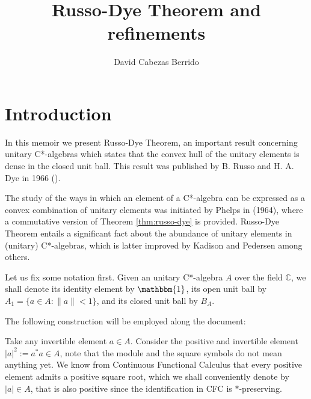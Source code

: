 \documentclass[12pt,english]{article}
\title{Russo-Dye Theorem and refinements}
\author{David Cabezas Berrido}
\date{}
\theoremstyle{definition}
\theoremstyle{remark}
\begin{document}
\maketitle

\section*{Introduction}

In this memoir we present Russo-Dye Theorem, an important result concerning unitary C*-algebras which states that the convex hull of the unitary elements is dense in the closed unit ball. This result was published by B. Russo and H. A. Dye in 1966 (\cite{russo-dye}).

The study of the ways in which an element of a C*-algebra can be expressed as a convex combination of unitary elements was initiated by Phelps in \cite{phelps} (1964), where a commutative version of Theorem \ref{thm:russo-dye} is provided. Russo-Dye Theorem entails a significant fact about the abundance of unitary elements in (unitary) C*-algebras, which is latter improved by Kadison and Pedersen among others.

Let us fix some notation first. Given an unitary C*-algebra $A$ over the field $\mathbb{C}$, we shall denote its identity element by $\mathbbm{1}$, its open unit ball by $A_1=\{a\in A: \|a\|<1\}$, and its closed unit ball by $B_A$.

The following construction will be employed along the document:

Take any invertible element $a\in A$. Consider the positive and invertible element $|a|^2:=a^*a\in A$, note that the module and the square symbols do not mean anything yet. We know from Continuous Functional Calculus that every positive element admits a positive square root, which we shall conveniently denote by $|a|\in A$, that is also positive since the identification in CFC is $*$-preserving.
\end{document}
